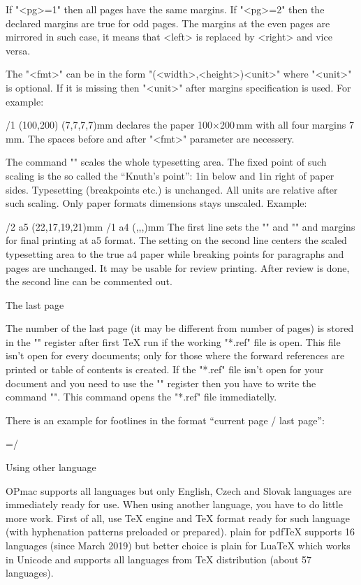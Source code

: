 If "<pg>=1" then all pages have the same margins. If "<pg>=2" then the
declared margins are true for odd pages. The margins at the even pages are
mirrored in such case, it means that <left> is replaced by <right> and vice
versa.

The "<fmt>" can be in the form "(<width>,<height>)<unit>" where "<unit>" is
optional. If it is missing then "<unit>" after margins specification is
used. For example:

\begtt
\margins/1 (100,200) (7,7,7,7)mm
\endtt
%
declares the paper 100$\times$200\,mm with all four margins 7\,mm. The spaces
before and after "<fmt>" parameter are necessery.

The command "\magscale[<factor>]" scales the whole typesetting area. The
fixed point of such scaling is the so called the ``Knuth's point'': 1in
below and 1in right of paper sides. Typesetting (breakpoints etc.) is
unchanged. All units are relative after such scaling. Only paper formats
dimensions stays unscaled. Example:

\begtt
\margins/2 a5 (22,17,19,21)mm
\magscale[1414] \margins/1 a4 (,,,)mm
\endtt
%
The first line sets the "\hsize" and "\vsize" and margins for final
printing at a5 format. The setting on the second line centers the scaled 
typesetting area to the true a4 paper while breaking points for paragraphs
and pages are unchanged. It may be usable for 
review printing. After review is done, the second line can be commented out.

\sec The last page

The number of the last page (it may be different from number of pages) is
stored in the "\lastpage" register after first \TeX{} run if the working "*.ref" 
file is open. This file isn't open for every documents; only for those
where the forward references are printed or table of contents is created.
If the "*.ref" file isn't open for your document and you need to use the "\lastpage"
register then you have to write the command "\openref". This command opens
the "*.ref" file immediatelly.

There is an example for footlines in the format ``current page / last
page'': 

\begtt
\footline={\hss \rm \thefontsize[10]\the\pageno/\the\lastpage \hss}
\endtt

\sec Using other language

OPmac supports all languages but only English, Czech and Slovak languages
are immediately ready for use. When using another language, you have to do
little more work. First of all, use \TeX{} engine and \TeX{} format ready
for such language (with hyphenation patterns preloaded or prepared). 
\CS{}plain for pdf\TeX{} supports 16 languages (since March 2019) but better
choice is \CS{}plain for Lua\TeX{} which works in Unicode and supports all
languages from \TeX{} distribution (about 57 languages).

